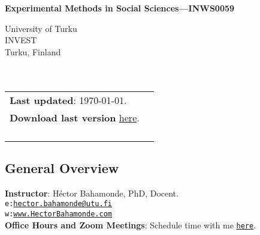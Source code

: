 \documentclass[letterpaper]{article}
\def\name{Experimental Methods in Social Sciences---INWS0059}
\begin{document}

\centerline{\huge \bf \name}



\vspace{0.25in}

\begin{minipage}{0.45\linewidth}
 University of Turku \\
  INVEST \\
  Turku, Finland\\
  \\
  \\

\end{minipage}
\hspace{4cm}\begin{minipage}{0.45\linewidth}
  \begin{tabular}{ll}
{\bf Last updated}: \today. \\
 {\bf Download last version} \href{https://github.com/hbahamonde/Exp_Soc_Science/raw/main/Bahamonde_Exp_Soc_Sci.pdf}{here}.%
    \\
    \\
    \\
    \\
    \\
  \end{tabular}
\end{minipage}

\subsection*{General Overview}


\vspace{1mm}
{\bf Instructor}: H\'ector Bahamonde, PhD, Docent.\\
\texttt{e:}\href{mailto:hector.bahamonde@utu.fi}{\texttt{hector.bahamonde@utu.fi}}\\
\texttt{w:}\href{http://www.hectorbahamonde.com}{\texttt{www.HectorBahamonde.com}}\\
{\bf Office Hours and Zoom Meetings}: Schedule time with me \href{https://calendly.com/bahamonde}{\texttt{here}}.\\
\end{document}
